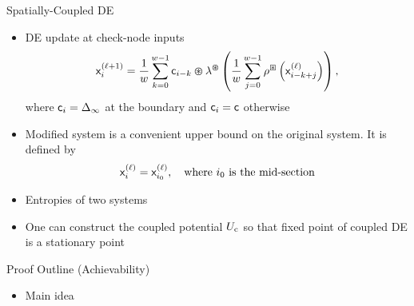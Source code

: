\documentclass{beamer}
\newlength{\twocolwid}
\begin{document}
\begin{columns}[t]
\begin{column}{\twocolwid}
\vspace{0.5cm}
\begin{block}{Spatially-Coupled DE}
  \begin{itemize}
  \item DE update at check-node inputs
    \begin{align*}
      \label{equation:scde_update_1_ldpc}
      \mathsf{x}_{i}^{(\ell+1)} = \frac{1}{w} \sum_{k=0}^{w-1} \mathsf{c}_{i-k} \varoast \lambda^{\varoast} \left(  \frac{1}{w} \sum_{j=0}^{w-1} \rho^{\boxast} \left( \mathsf{x}_{i-k+j}^{(\ell)} \right) \right) ,
    \end{align*}
    where $\mathsf{c}_i=\Delta_\infty$ at the boundary and $\mathsf{c}_i=\mathsf{c}$ otherwise
  \item \alert{Modified system} is a convenient upper bound on the original system.
    It is defined by
    \begin{align*}
      \mathsf{x}_{i}^{(\ell)} = \mathsf{x}_{i_0}^{(\ell)},  \quad \text{where $i_0$ is the mid-section}
    \end{align*}
  \item Entropies of two systems
    \vspace{1cm}
    \begin{center}
      \resizebox{18cm}{9cm}{
        
      }
    \end{center}
  \item One can construct the \alert{coupled potential} $U_\mathrm{c}$ so that fixed point of coupled DE is a stationary point
  \end{itemize}
\end{block}

\vspace{0.5cm}
\begin{block}{Proof Outline (Achievability)}
  \begin{itemize}
  \item Main idea
    

\end{itemize}
\end{block}
\end{column}
\end{columns}
\end{document}
